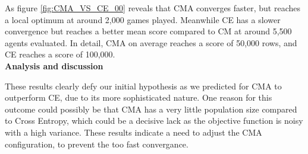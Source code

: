 As figure \ref{fig:CMA_VS_CE_00} reveals that CMA converges faster,
but reaches a local optimum at around 2,000 games played. Meanwhile CE has a 
slower convergence but reaches a better mean score compared to CM at around 5,500
agents evaluated. In detail, CMA on average reaches a score of 50,000 rows, and
CE reaches a score of 100,000.\\

\textbf{Analysis and discussion}

These results clearly defy our initial hypothesis as we predicted
for CMA to outperform CE, due to its more sophisticated nature. 
One reason for this outcome could possibly be that
CMA has a very little population size compared to Cross Entropy,
which could be a decisive lack as the objective function is noisy with 
a high variance. These results indicate a need to adjust the CMA
configuration, to prevent the too fast convergance.

